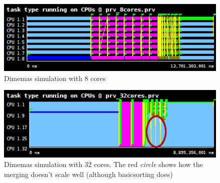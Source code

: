 \documentclass[a4paper,11pt]{article}
\begin{document}
\begin{enumerate}
\vspace{0.5cm}
\begin{figure}[h!]
  \center
  \includegraphics[width=1.0\textwidth]{figs/paraver_8_cores.png}
  \caption{Dimemas simulation with 8 cores}
\end{figure}

\vspace{0.5cm}
\begin{figure}[h!]
  \center
  \includegraphics[width=1.0\textwidth]{figs/paraver_32_cores.png}
  \caption{Dimemas simulation with 32 cores. The red \emph{circle} shows how the
    merging doesn't scale well (although basicsorting does)}
\end{figure}

\end{enumerate}

\newpage
\end{document}
